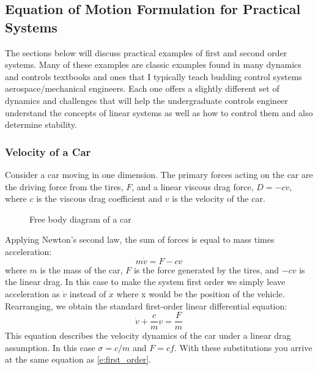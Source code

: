\subsection{Equation of Motion Formulation for Practical Systems}

The sections below will discuss practical examples of first and second order systems. Many of these examples are classic examples found in many dynamics and controls textbooks and ones that I typically teach budding control systems aerospace/mechanical engineers. Each one offers a slightly different set of dynamics and challenges that will help the undergraduate controls engineer understand the concepts of linear systems as well as how to control them and also determine stability. 

\subsubsection{Velocity of a Car}

Consider a car moving in one dimension. The primary forces acting on the car are the driving force from the tires, $F$, and a linear viscous drag force, $D = -cv$, where $c$ is the viscous drag coefficient and $v$ is the velocity of the car.
\begin{figure}[H]
    \centering
    \caption{Free body diagram of a car}
    \label{f:car_fbd}
\end{figure}
\noindent Applying Newton's second law, the sum of forces is equal to mass times acceleration:
\begin{equation}
  m\dot{v} = F - cv
\end{equation}
where $m$ is the mass of the car, $F$ is the force generated by the tires, and $-cv$ is the linear drag. In this case to make the system first order we simply leave acceleration as $\dot{v}$ instead of $\ddot{x}$ where x would be the position of the vehicle. Rearranging, we obtain the standard first-order linear differential equation:
\begin{equation}
  \dot{v} + \frac{c}{m}v = \frac{F}{m}
\end{equation}
This equation describes the velocity dynamics of the car under a linear drag assumption. In this case $\sigma = c/m$ and $F = cf$. With these substitutions you arrive at the same equation as \ref{e:first_order}.


